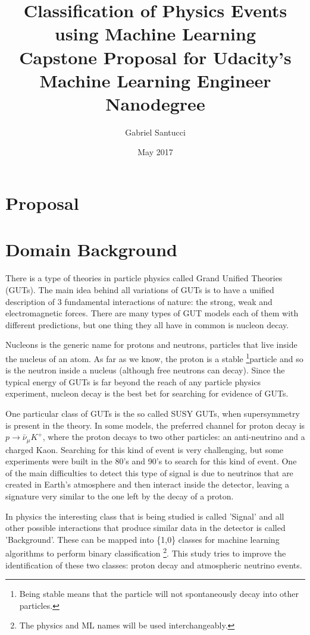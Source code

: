 \documentclass[11pt, oneside]{article}   	%
\title{Classification of Physics Events using Machine Learning\\
	\large Capstone Proposal for Udacity's Machine Learning Engineer Nanodegree}
\author{Gabriel Santucci}
\date{May 2017}
\begin{document}
\maketitle

\section*{Proposal}
 \label{Domain_Background} \section{Domain Background}
There is a type of theories in particle physics called Grand Unified Theories (GUTs). The main idea behind all variations of GUTs is to have a unified description of 3 fundamental interactions of nature: the strong, weak and electromagnetic forces. There are many types of GUT models \cite{GUTs} each of them with different predictions, but one thing they all have in common is nucleon decay.

Nucleons is the generic name for protons and neutrons, particles that live inside the nucleus of an atom. As far as we know, the proton is a stable \footnote{Being stable means that the particle will not spontaneously decay into other particles.}particle and so is the neutron inside a nucleus (although free neutrons can decay). Since the typical energy of GUTs is far beyond the reach of any particle physics experiment, nucleon decay is the best bet for searching for evidence of GUTs.

One particular class of GUTs is the so called SUSY GUTs, when supersymmetry is present in the theory. In some models, the preferred channel for proton decay is $p\rightarrow \bar{\nu}_{\mu}K^{+}$, where the proton decays to two other particles: an anti-neutrino and a charged Kaon. Searching for this kind of event is very challenging, but some experiments were built in the 80's and 90's to search for this kind of event. One of the main difficulties to detect this type of signal is due to neutrinos that are created in Earth's atmosphere and then interact inside the detector, leaving a signature very similar to the one left by the decay of a proton.

In physics the interesting class that is being studied is called 'Signal' and all other possible interactions that produce similar data in the detector is called 'Background'. These can be mapped into \{1,0\} classes for machine learning algorithms to perform binary classification \footnote{The physics and ML names will be used interchangeably.}.  This study tries to improve the identification of these two classes: proton decay and atmospheric neutrino events.
\end{document}
